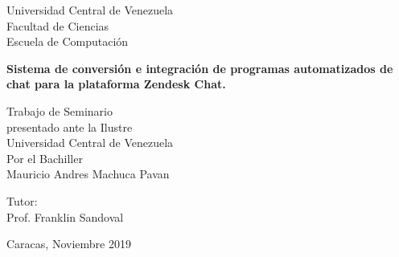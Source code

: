\begin{center}
	Universidad Central de Venezuela\\
	Facultad de Ciencias\\
	Escuela de Computación\\
	
\end{center}

\vspace{2.5cm}
\begin{center}
	\large{\textbf{ Sistema de conversión e integración de programas automatizados de chat para la plataforma Zendesk Chat.}}
\end{center}

\vspace{5.0cm}
\begin{center}
	Trabajo de Seminario \\
	presentado ante la Ilustre\\
	Universidad Central de Venezuela\\
	Por el Bachiller\\
	Mauricio Andres Machuca Pavan\\
\end{center}

\begin{center}
	Tutor:\\ Prof. Franklin Sandoval\\
\end{center}

\vspace{1.0cm}
\begin{center}
	Caracas, Noviembre 2019
\end{center}